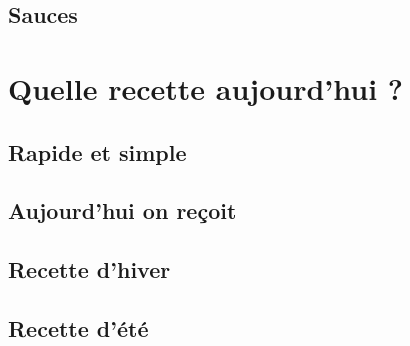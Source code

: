 \documentclass[A4paper,twoside, 12pt]{book}
\begin{document}
	\chapter{Sauces}


\part{Quelle recette aujourd'hui ?}
	\chapter{Rapide et simple}
	\chapter{Aujourd'hui on reçoit}
	\chapter{Recette d'hiver}
	\chapter{Recette d'\'et\'e}

\printindex

\backmatter
\end{document}

